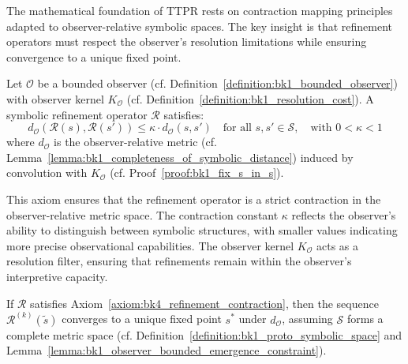 The mathematical foundation of TTPR rests on contraction mapping principles adapted to observer-relative symbolic spaces. The key insight is that refinement operators must respect the observer's resolution limitations while ensuring convergence to a unique fixed point.

\begin{axiom}
\label{axiom:bk4_refinement_contraction}
Let $\mathcal{O}$ be a bounded observer (cf. Definition~\ref{definition:bk1_bounded_observer}) with observer kernel $K_{\mathcal{O}}$ (cf. Definition~\ref{definition:bk1_resolution_cost}). A symbolic refinement operator $\mathcal{R}$ satisfies:
\[
d_{\mathcal{O}}(\mathcal{R}(s), \mathcal{R}(s')) \le \kappa \cdot d_{\mathcal{O}}(s, s') \quad \text{for all } s, s' \in \mathcal{S}, \quad \text{with } 0 < \kappa < 1
\]
where $d_{\mathcal{O}}$ is the observer-relative metric (cf. Lemma~\ref{lemma:bk1_completeness_of_symbolic_distance}) induced by convolution with $K_{\mathcal{O}}$ (cf. Proof~\ref{proof:bk1_fix_s_in_s}).
\end{axiom}

This axiom ensures that the refinement operator is a strict contraction in the observer-relative metric space. The contraction constant $\kappa$ reflects the observer's ability to distinguish between symbolic structures, with smaller values indicating more precise observational capabilities. The observer kernel $K_{\mathcal{O}}$ acts as a resolution filter, ensuring that refinements remain within the observer's interpretive capacity.

\begin{proposition}
\label{proposition:bk4_ttpr_convergence}
If $\mathcal{R}$ satisfies Axiom~\ref{axiom:bk4_refinement_contraction}, then the sequence $\mathcal{R}^{(k)}(\tilde{s})$ converges to a unique fixed point $s^*$ under $d_{\mathcal{O}}$, assuming $\mathcal{S}$ forms a complete metric space (cf. Definition~\ref{definition:bk1_proto_symbolic_space} and Lemma~\ref{lemma:bk1_observer_bounded_emergence_constraint}).
\end{proposition}


